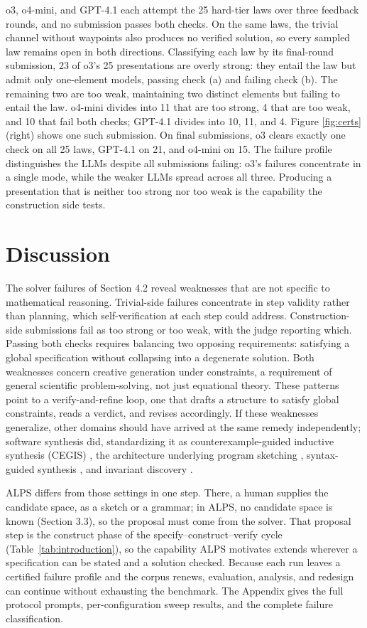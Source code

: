 \documentclass[letterpaper]{article} %
\begin{document}
o3, o4-mini, and GPT-4.1 each attempt the 25 hard-tier laws over three feedback rounds, and no submission passes both checks. On the same laws, the trivial channel without waypoints also produces no verified solution, so every sampled law remains open in both directions. Classifying each law by its final-round submission, 23 of o3's 25 presentations are overly strong: they entail the law but admit only one-element models, passing check (a) and failing check (b). The remaining two are too weak, maintaining two distinct elements but failing to entail the law. o4-mini divides into 11 that are too strong, 4 that are too weak, and 10 that fail both checks; GPT-4.1 divides into 10, 11, and 4. Figure \ref{fig:certs} (right) shows one such submission. On final submissions, o3 clears exactly one check on all 25 laws, GPT-4.1 on 21, and o4-mini on 15. The failure profile distinguishes the LLMs despite all submissions failing: o3's failures concentrate in a single mode, while the weaker LLMs spread across all three. Producing a presentation that is neither too strong nor too weak is the capability the construction side tests.



\section{Discussion}
The solver failures of Section 4.2 reveal weaknesses that are not specific to mathematical reasoning. Trivial-side failures concentrate in step validity rather than planning, which self-verification at each step could address. Construction-side submissions fail as too strong or too weak, with the judge reporting which. Passing both checks requires balancing two opposing requirements: satisfying a global specification without collapsing into a degenerate solution. Both weaknesses concern creative generation under constraints, a requirement of general scientific problem-solving, not just equational theory. These patterns point to a verify-and-refine loop, one that drafts a structure to satisfy global constraints, reads a verdict, and revises accordingly. If these weaknesses generalize, other domains should have arrived at the same remedy independently; software synthesis did, standardizing it as counterexample-guided inductive synthesis (CEGIS) \citep{solar2006combinatorial}, the architecture underlying program sketching \citep{solar2013program}, syntax-guided synthesis \citep{alur2013syntax}, and invariant discovery \citep{garg2014ice}.

ALPS differs from those settings in one step. There, a human supplies the candidate space, as a sketch or a grammar; in ALPS, no candidate space is known (Section 3.3), so the proposal must come from the solver. That proposal step is the construct phase of the specify--construct--verify cycle (Table~\ref{tab:introduction}), so the capability ALPS motivates extends wherever a specification can be stated and a solution checked. Because each run leaves a certified failure profile and the corpus renews, evaluation, analysis, and redesign can continue without exhausting the benchmark. The Appendix gives the full protocol prompts, per-configuration sweep results, and the complete failure classification.
\end{document}
